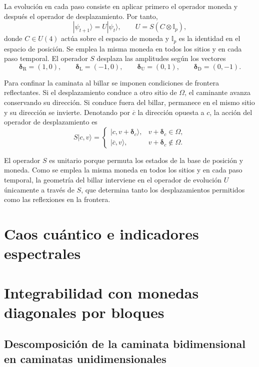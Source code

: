 \documentclass[12pt,a4paper,oneside]{report} %
\begin{document}
La evolución en cada paso consiste en aplicar primero el operador moneda y después el operador de desplazamiento. Por tanto,
\begin{equation}
  |\psi_{t+1}\rangle=U|\psi_t\rangle,
  \qquad
  U=S(C\otimes\mathbb I_p),
\end{equation}
donde $C\in U(4)$ actúa sobre el espacio de moneda y $\mathbb I_p$ es la identidad en el espacio de posición. Se emplea la misma moneda en todos los sitios y en cada paso temporal. El operador $S$ desplaza las amplitudes según los vectores
\begin{equation}
  \boldsymbol\delta_{\mathrm{R}}=(1,0),\qquad
  \boldsymbol\delta_{\mathrm{L}}=(-1,0),\qquad
  \boldsymbol\delta_{\mathrm{U}}=(0,1),\qquad
  \boldsymbol\delta_{\mathrm{D}}=(0,-1).
\end{equation}

Para confinar la caminata al billar se imponen condiciones de frontera reflectantes. Si el desplazamiento conduce a otro sitio de $\Omega$, el caminante avanza conservando su dirección. Si conduce fuera del billar, permanece en el mismo sitio y su dirección se invierte. Denotando por $\overline c$ la dirección opuesta a $c$, la acción del operador de desplazamiento es
\begin{equation}
  S|c,v\rangle=
  \begin{cases}
    |c,v+\boldsymbol\delta_c\rangle,
      &v+\boldsymbol\delta_c\in\Omega,\\[2pt]
    |\overline c,v\rangle,
      &v+\boldsymbol\delta_c\notin\Omega.
  \end{cases}
\end{equation}

El operador $S$ es unitario porque permuta los estados de la base de posición y moneda. Como se emplea la misma moneda en todos los sitios y en cada paso temporal, la geometría del billar interviene en el operador de evolución $U$ únicamente a través de $S$, que determina tanto los desplazamientos permitidos como las reflexiones en la frontera.

\chapter{Caos cuántico e indicadores espectrales} %
\chapter{Integrabilidad con monedas diagonales por bloques} %
\section{Descomposición de la caminata bidimensional en caminatas unidimensionales} %
\end{document}

